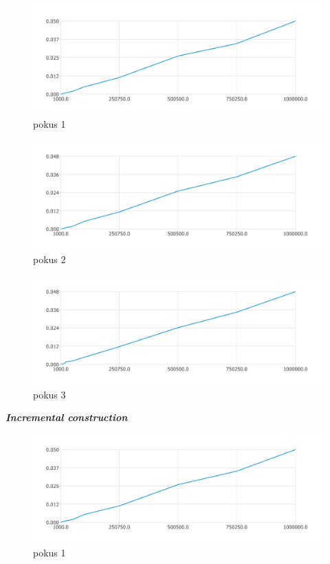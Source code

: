 \documentclass{article}
\begin{document}
\begin{figure}[htbp]
\centering
        \includegraphics[clip, trim=0cm 0cm 0cm 0cm, width=1\textwidth]{pdf4.pdf}
        \caption{pokus 1}
\end{figure}
\begin{figure}[htbp]
\centering
        \includegraphics[clip, trim=0cm 0cm 0cm 0cm, width=1\textwidth]{pdf5.pdf}
        \caption{pokus 2}
\end{figure}
\begin{figure}[htbp]
\centering
        \includegraphics[clip, trim=0cm 0cm 0cm 0cm, width=1\textwidth]{pdf6.pdf}
        \caption{pokus 3}
\end{figure}
\clearpage
\newpage
\textit{\textbf {Incremental construction}}
\\
\begin{figure}[htbp]
\centering
        \includegraphics[clip, trim=0cm 0cm 0cm 0cm, width=1\textwidth]{pdf7.pdf}
        \caption{pokus 1}
\end{figure}
\end{document}
